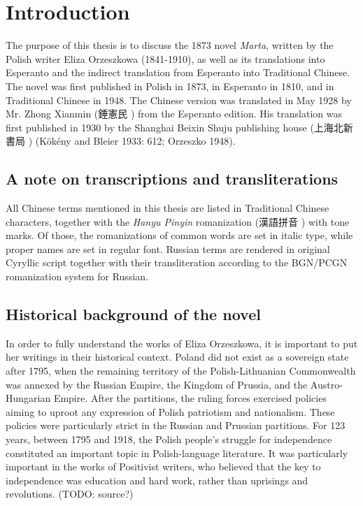 \chapter{Introduction}

The purpose of this thesis is to discuss the 1873 novel \textit{Marta}, written by the Polish writer Eliza Orzeszkowa (1841-1910), as well as its translations into Esperanto and the indirect translation from Esperanto into Traditional Chinese.
The novel was first published in Polish in 1873, in Esperanto in 1810, and in Traditional Chinese in 1948.
The Chinese version was translated in May 1928 by Mr. Zhong Xianmin (錘憲民 ) from the Esperanto edition.
His translation was first published in 1930 by the Shanghai Beixin Shuju publishing house (上海北新書局 )
(Kökény and Bleier 1933: 612; Orzeszko 1948).

\section{A note on transcriptions and transliterations}

All Chinese terms mentioned in this thesis are listed in Traditional Chinese characters, together with the \textit{Hanyu Pinyin} romanization (漢語拼音 ) with tone marks. Of those, the romanizations of common words are set in italic type, while proper names are set in regular font. Russian terms are rendered in original Cyryllic script together with their transliteration according to the BGN/PCGN romanization system for Russian.

\section{Historical background of the novel}

In order to fully understand the works of Eliza Orzeszkowa, it is important to put her writings in their historical context.
Poland did not exist as a sovereign state after 1795, when the remaining territory of the Polish-Lithuanian Commonwealth was annexed by the Russian Empire, the  Kingdom of Prussia, and the Austro-Hungarian Empire.
After the partitions, the ruling forces exercised policies aiming to uproot any expression of Polish patriotism and nationalism. These policies were particularly strict in the Russian and Prussian partitions.
For 123 years, between 1795 and 1918, the Polish people's struggle for independence constituted an important topic in Polish-language literature.
It was particularly important in the works of Positivist writers, who believed that the key to independence was education and hard work, rather than uprisings and revolutions. (TODO: source?)

